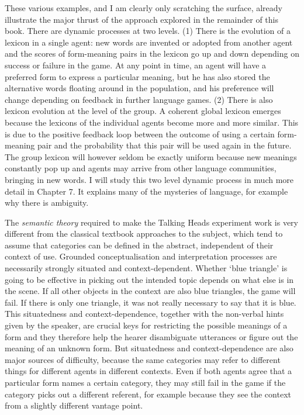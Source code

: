 These various examples, and I am clearly only 
scratching the surface, already illustrate the major thrust of the 
approach explored in the remainder of this book. 
There are dynamic processes at two levels. (1) There is 
the evolution of a lexicon in a single agent: new words are
invented or adopted from another agent and the
scores of form-meaning pairs in the lexicon
go up and down depending on success or
failure in the game. At any point in time, an agent 
will have a preferred form to express a particular meaning, 
but he has also stored the alternative words floating around in the 
population, and his preference will change depending on feedback
in further language games. (2) There is also lexicon evolution at 
the level of the group. A coherent global lexicon emerges because
the lexicons of the individual agents become more and more 
similar. This is due to the positive feedback loop between
the outcome of using
a certain form-meaning pair and the probability that
this pair will be used again in the future. 
The group lexicon will however seldom be exactly uniform because
new meanings constantly pop up and agents may arrive from 
other language communities, bringing in new words. 
I will study this two level dynamic process in much more detail 
in Chapter 7. It explains many of the mysteries of
language, for example why there is ambiguity. 

The {\it semantic theory} required to make the 
Talking Heads experiment work is very different from 
the classical textbook approaches to the subject, which
tend to assume that categories can be defined in the 
abstract, independent of their context of use. Grounded
conceptualisation and interpretation processes are necessarily 
strongly situated and context-dependent. Whether `blue 
triangle' is going to be effective in picking out the 
intended topic depends on what else is in
the scene. If all other objects in the 
context are also blue triangles, the game will fail. If there
is only one triangle, it was not really necessary to say that 
it is blue. This situatedness and context-dependence, together with 
the non-verbal hints given by the speaker, are crucial 
keys for restricting the 
possible meanings of a form 
and they therefore help the hearer disambiguate 
utterances or figure out the meaning of an unknown form. But situatedness 
and context-dependence are also major
sources of difficulty, because the same categories may
refer to different things for different agents in different
contexts. Even if both agents agree that a particular form 
names a certain category, 
they may still fail in the game if the category picks
out a different referent, for example because they see 
the context from a slightly different vantage point. 


